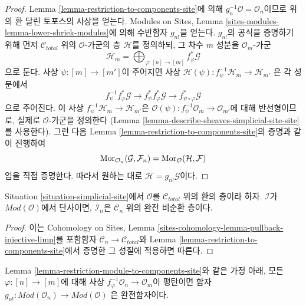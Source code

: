 \begin{proof}
Lemma \ref{lemma-restriction-to-components-site}에 의해
$g_n^{-1}\mathcal{O} = \mathcal{O}_n$이므로 위의 환 달린 토포스의 사상을 얻는다.
Modules on Sites, Lemma \ref{sites-modules-lemma-lower-shriek-modules}에 의해
수반함자 $g_{n!}$을 얻는다. $g_{n!}$의 공식을 증명하기 위해 먼저
$\mathcal{C}_{total}$ 위의 $\mathcal{O}$-가군의 층 $\mathcal{H}$를
정의하되, 그 차수 $m$ 성분을 $\mathcal{O}_m$-가군
$$
\mathcal{H}_m =
\bigoplus\nolimits_{\varphi : [n] \to [m]} f_\varphi^*\mathcal{G}
$$
으로 둔다. 사상 $\psi : [m] \to [m']$이 주어지면 사상
$\mathcal{H}(\psi) : f_\psi^{-1}\mathcal{H}_m \to \mathcal{H}_{m'}$
은 각 성분에서
$$
f_\psi^{-1} f_\varphi^*\mathcal{G} \to
f_\psi^* f_\varphi^*\mathcal{G} \to
f_{\psi \circ \varphi}^*\mathcal{G}
$$
으로 주어진다. 이 사상
$f_\psi^{-1}\mathcal{H}_m \to \mathcal{H}_{m'}$은
$\mathcal{O}(\psi) : f_\psi^{-1}\mathcal{O}_m \to \mathcal{O}_{m'}$에 대해
반선형이므로, 실제로 $\mathcal{O}$-가군을 정의한다
(Lemma \ref{lemma-describe-sheaves-simplicial-site-site}를 사용한다).
그런 다음 Lemma \ref{lemma-restriction-to-components-site}의 증명과 같이 진행하여
$$
\mathop{\mathrm{Mor}}\nolimits_{\mathcal{O}_n}(\mathcal{G}, \mathcal{F}_n) =
\mathop{\mathrm{Mor}}\nolimits_{\mathcal{O}}(\mathcal{H}, \mathcal{F})
$$
임을 직접 증명한다. 따라서 원하는 대로
$\mathcal{H} = g_{n!}\mathcal{G}$이다.
\end{proof}

\begin{lemma}
\label{lemma-restriction-injective-to-component-limp}
Situation \ref{situation-simplicial-site}에서 $\mathcal{O}$를
$\mathcal{C}_{total}$ 위의 환의 층이라 하자.
$\mathcal{I}$가 $\textit{Mod}(\mathcal{O})$에서 단사이면,
$\mathcal{I}_n$은 $\mathcal{C}_n$ 위의 완전 비순환 층이다.
\end{lemma}

\begin{proof}
이는 Cohomology on Sites, Lemma
\ref{sites-cohomology-lemma-pullback-injective-limp}를
포함함자 $\mathcal{C}_n \to \mathcal{C}_{total}$와
Lemma \ref{lemma-restriction-to-components-site}에서 증명한 그 성질에
적용하면 따른다.
\end{proof}

\begin{lemma}
\label{lemma-exactness-g-shriek-modules}
Lemma \ref{lemma-restriction-module-to-components-site}와 같은 가정 아래,
모든 $\varphi : [n] \to [m]$에 대해 사상
$f_\varphi^{-1}\mathcal{O}_n \to \mathcal{O}_m$이 평탄이면 함자
$g_{n!} : \textit{Mod}(\mathcal{O}_n) \to \textit{Mod}(\mathcal{O})$
은 완전함자이다.
\end{lemma}

